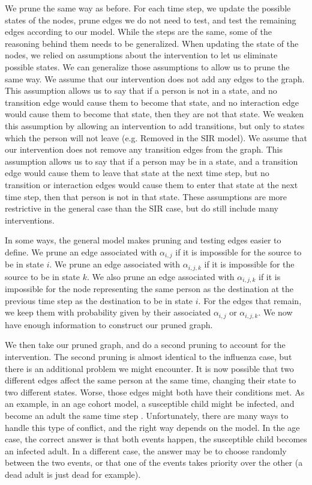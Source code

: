 \documentclass[openacc]{rsproca_new}%
\begin{document}
We prune the same way as before.
For each time step, we update the possible states of the nodes, prune edges we do not need to test, and test the remaining edges according to our model.
While the steps are the same, some of the reasoning behind them needs to be generalized.
When updating the state of the nodes, we relied on assumptions about the intervention to let us eliminate possible states.
We can generalize those assumptions to allow us to prune the same way.
We assume that our intervention does not add any edges to the graph.
This assumption allows us to say that if a person is not in a state, and no transition edge would cause them to become that state, and no interaction edge would cause them to become that state, then they are not that state.
We weaken this assumption by allowing an intervention to add transitions, but only to states which the person will not leave (e.g. Removed in the SIR model).
We assume that our intervention does not remove any transition edges from the graph.
This assumption allows us to say that if a person may be in a state, and a transition edge would cause them to leave that state at the next time step, but no transition or interaction edges would cause them to enter that state at the next time step, then that person is not in that state.
These assumptions are more restrictive in the general case than the SIR case, but do still include many interventions.

In some ways, the general model makes pruning and testing edges easier to define.
We prune an edge associated with $\alpha_{i,j}$ if it is impossible for the source to be in state $i$.
We prune an edge associated with $\alpha_{i,j,k}$ if it is impossible for the source to be in state $k$.
We also prune an edge associated with $\alpha_{i,j,k}$ if it is impossible for the node representing the same person as the destination at the previous time step as the destination to be in state $i$.
For the edges that remain, we keep them with probability given by their associated $\alpha_{i,j}$ or $\alpha_{i,j,k}$.
We now have enough information to construct our pruned graph.

We then take our pruned graph, and do a second pruning to account for the intervention.
The second pruning is almost identical to the influenza case, but there is an additional problem we might encounter.
It is now possible that two different edges affect the same person at the same time, changing their state to two different states.
Worse, those edges might both have their conditions met.
As an example, in an age cohort model, a susceptible child might be infected, and become an adult the same time step .
Unfortunately, there are many ways to handle this type of conflict, and the right way depends on the model.
In the age case, the correct answer is that both events happen, the susceptible child becomes an infected adult.
In a different case, the answer may be to choose randomly between the two events, or that one of the events takes priority over the other (a dead adult is just dead for example).
\end{document}
